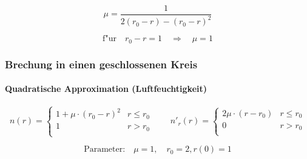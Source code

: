 \documentclass{beamer}
\begin{document}
{\begin{frame}
    $$\mu = \frac{1}{2 (r_0 - r) - (r_0 - r)^2}$$
    
    $$\text{f"ur} \quad r_0 - r = 1 \quad \Rightarrow \quad \mu = 1$$
    
  \end{frame}
  
  \begin{frame}
    \frametitle{Brechung in einen geschlossenen Kreis}
    \framesubtitle{Quadratische Approximation (Luftfeuchtigkeit)}

    $$n(r) = \left\{ \begin{array}{ll}
      {\scriptstyle 1 + \mu \cdot (r_0 - r)^2} & {\scriptstyle r \leq r_0 } \\
      {\scriptstyle 1 } & {\scriptstyle r > r_0 } \\
    \end{array} \right. \qquad
    n'_r(r) = \left\{ \begin{array}{ll}
      {\scriptstyle 2\mu \cdot (r - r_0) } & {\scriptstyle r \leq r_0 } \\
      {\scriptstyle 0 } & {\scriptstyle r > r_0 } \\
    \end{array} \right.$$
    
    $$\text{Parameter:} \quad \mu = 1, \quad r_0 = 2, r(0) = 1$$
    

\end{frame}}
\end{document}
